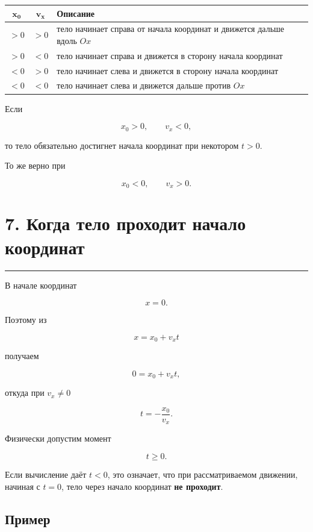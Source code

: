 \documentclass[a4paper,12pt]{article}
\newcommand{\sectionline}{%
  \par\noindent\color{accent}\rule{\linewidth}{0.5pt}\color{textgray}\par
}
\newcommand{\important}[1]{\textbf{\color{darkaccent}#1}}
\begin{document}
\begin{table}[h!]
\centering
\renewcommand{\arraystretch}{1.4}
\begin{tabularx}{\linewidth}{@{}ccX@{}}
\toprule
\(\boldsymbol{x_0}\) &
\(\boldsymbol{v_x}\) &
\textbf{Описание} \\
\midrule
\(>0\) & \(>0\) &
тело начинает справа от начала координат и движется дальше вдоль \(Ox\) \\
\(>0\) & \(<0\) &
тело начинает справа и движется в сторону начала координат \\
\(<0\) & \(>0\) &
тело начинает слева и движется в сторону начала координат \\
\(<0\) & \(<0\) &
тело начинает слева и движется дальше против \(Ox\) \\
\bottomrule
\end{tabularx}
\end{table}

Если

\[
x_0>0,\qquad v_x<0,
\]

то тело обязательно достигнет начала координат при некотором \(t>0\).

То же верно при

\[
x_0<0,\qquad v_x>0.
\]


\section{\color{darkaccent}7. Когда тело проходит начало координат}
\sectionline

В начале координат

\[
x=0.
\]

Поэтому из

\[
x=x_0+v_xt
\]

получаем

\[
0=x_0+v_xt,
\]

откуда при \(v_x\neq0\)

\[
\boxed{t=-\frac{x_0}{v_x}}.
\]

Физически допустим момент

\[
\boxed{t\ge0}.
\]

Если вычисление даёт \(t<0\), это означает, что при рассматриваемом движении,
начиная с \(t=0\), тело через начало координат \important{не проходит}.

\subsection*{Пример}
\end{document}
